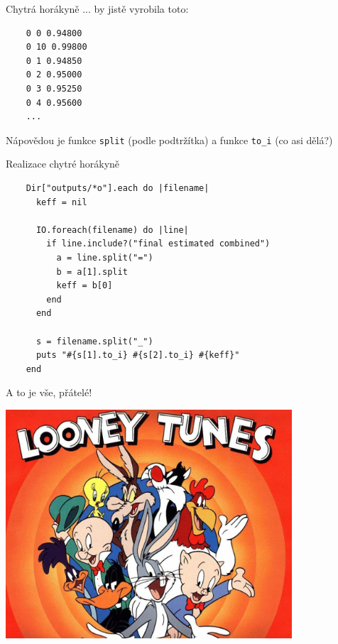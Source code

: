 \documentclass{beamer}
\begin{document}
\begin{frame}[fragile]{Chytrá horákyně}
  ... by jistě vyrobila toto:
  {\scriptsize
  \begin{verbatim}
    0 0 0.94800
    0 10 0.99800
    0 1 0.94850
    0 2 0.95000
    0 3 0.95250
    0 4 0.95600
    ...
  \end{verbatim}
  }
  Nápovědou je funkce \texttt{split} (podle podtržítka) a funkce \texttt{to\_i} (co asi dělá?)
\end{frame}

\begin{frame}[fragile]{Realizace chytré horákyně}
  \scriptsize
  \begin{verbatim}
    Dir["outputs/*o"].each do |filename|
      keff = nil

      IO.foreach(filename) do |line|
        if line.include?("final estimated combined")
          a = line.split("=")
          b = a[1].split
          keff = b[0]
        end
      end

      s = filename.split("_")
      puts "#{s[1].to_i} #{s[2].to_i} #{keff}"
    end
  \end{verbatim}
\end{frame}

\begin{frame}{A to je vše, přátelé!}
  \begin{center}
    \includegraphics[width=0.8\textwidth]{looney_tunes}
  \end{center}
\end{frame}
\end{document}
